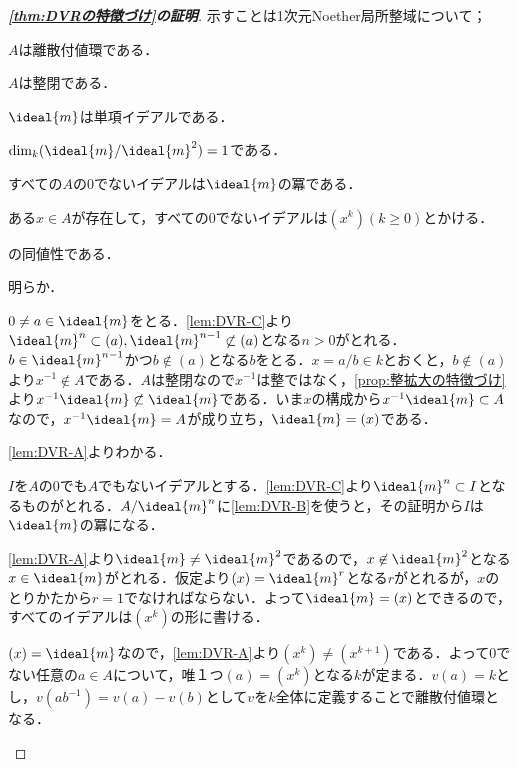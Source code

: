 \begin{proof}[\textbf{\ref{thm:DVRの特徴づけ}の証明}]
	示すことは1次元Noether局所整域について；
	\begin{sakura}
		\item $A$は離散付値環である．
		\item $A$は整閉である．
		\item $\ideal{m}$は単項イデアルである．
		\item $\dim_k (\ideal{m}/\ideal{m}^2)=1$である．
		\item すべての$A$の0でないイデアルは$\ideal{m}$の冪である．
		\item ある$x\in A$が存在して，すべての0でないイデアルは$(x^k) (k\geq0)$とかける．
	\end{sakura}
	の同値性である．
	\begin{eqv}[6]
		\item 明らか．
		\item $0\neq a\in\ideal{m}$をとる．\ref{lem:DVR-C}より$\ideal{m}^n\subset(a),\ideal{m}^{n-1}\not\subset(a)$となる$n>0$がとれる．$b\in\ideal{m}^{n-1}$かつ$b\not\in(a)$となる$b$をとる．$x=a/b\in k$とおくと，$b\not\in(a)$より$x^{-1}\not\in A$である．$A$は整閉なので$x^{-1}$は整ではなく，\ref{prop:整拡大の特徴づけ}より$x^{-1}\ideal{m}\not\subset\ideal{m}$である．いま$x$の構成から$x^{-1}\ideal{m}\subset A$なので，$x^{-1}\ideal{m}=A$が成り立ち，$\ideal{m}=(x)$である．
		
		\item \ref{lem:DVR-A}よりわかる．
		
		\item $I$を$A$の$0$でも$A$でもないイデアルとする．\ref{lem:DVR-C}より$\ideal{m}^n\subset I$となるものがとれる．$A/\ideal{m}^n$に\ref{lem:DVR-B}を使うと，その証明から$I$は$\ideal{m}$の冪になる．
		
		\item \ref{lem:DVR-A}より$\ideal{m}\neq\ideal{m}^2$であるので，$x\not\in\ideal{m}^2$となる$x\in\ideal{m}$がとれる．仮定より$(x)=\ideal{m}^r$となる$r$がとれるが，$x$のとりかたから$r=1$でなければならない．よって$\ideal{m}=(x)$とできるので，すべてのイデアルは$(x^k)$の形に書ける．
		
		\item $(x)=\ideal{m}$なので，\ref{lem:DVR-A}より$(x^k)\neq(x^{k+1})$である．よって0でない任意の$a\in A$について，唯１つ$(a)=(x^k)$となる$k$が定まる．$v(a)=k$とし，$v(ab^{-1})=v(a)-v(b)$として$v$を$k$全体に定義することで離散付値環となる．
	\end{eqv}
\end{proof}

